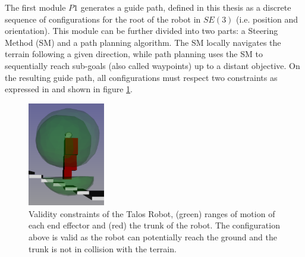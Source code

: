 The first module $P1$ generates a guide path, defined in this thesis as a discrete sequence of configurations for the root of the robot in $SE(3)$ (i.e. position and orientation).
This module can be further divided into two parts: a Steering Method (SM) and a path planning algorithm.
The SM locally navigates the terrain following a given direction, while path planning uses the SM to sequentially reach sub-goals (also called waypoints) up to a distant objective. 
On the resulting guide path, all configurations must respect two constraints as expressed in \cite{RB-PRM} and shown in figure \ref{fig:ROMs}.

\begin{figure}
    \centering
    \includegraphics[width=0.3\textwidth]{Figures/Chapter_LEAS/ROMs.png}
    \caption{Validity constraints of the Talos Robot, (green) ranges of motion of each end effector and (red) the trunk of the robot. The configuration above is valid as the robot can potentially reach the ground and the trunk is not in collision with the terrain.}
    \label{fig:ROMs}
\end{figure}

